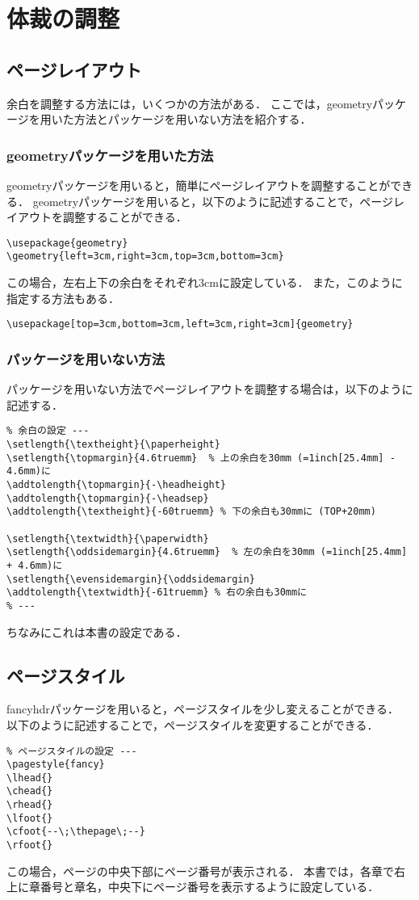 \section{体裁の調整}
\subsection{ページレイアウト}
余白を調整する方法には，いくつかの方法がある．
ここでは，geometryパッケージを用いた方法とパッケージを用いない方法を紹介する．
\subsubsection{geometryパッケージを用いた方法}
geometryパッケージを用いると，簡単にページレイアウトを調整することができる．
geometryパッケージを用いると，以下のように記述することで，ページレイアウトを調整することができる．
\begin{lstlisting}
\usepackage{geometry}
\geometry{left=3cm,right=3cm,top=3cm,bottom=3cm}
\end{lstlisting}
この場合，左右上下の余白をそれぞれ3cmに設定している．
また，このように指定する方法もある．
\begin{lstlisting}
\usepackage[top=3cm,bottom=3cm,left=3cm,right=3cm]{geometry}
\end{lstlisting}
\subsubsection{パッケージを用いない方法}
パッケージを用いない方法でページレイアウトを調整する場合は，以下のように記述する．
\begin{lstlisting}
% 余白の設定 ---
\setlength{\textheight}{\paperheight}
\setlength{\topmargin}{4.6truemm}  % 上の余白を30mm (=1inch[25.4mm] - 4.6mm)に
\addtolength{\topmargin}{-\headheight}
\addtolength{\topmargin}{-\headsep}
\addtolength{\textheight}{-60truemm} % 下の余白も30mmに (TOP+20mm)

\setlength{\textwidth}{\paperwidth}
\setlength{\oddsidemargin}{4.6truemm}  % 左の余白を30mm (=1inch[25.4mm] + 4.6mm)に
\setlength{\evensidemargin}{\oddsidemargin}
\addtolength{\textwidth}{-61truemm} % 右の余白も30mmに
% ---
\end{lstlisting}
ちなみにこれは本書の設定である．
\subsection{ページスタイル}
fancyhdrパッケージを用いると，ページスタイルを少し変えることができる．
以下のように記述することで，ページスタイルを変更することができる．
\begin{lstlisting}
% ページスタイルの設定 ---
\pagestyle{fancy}
\lhead{}
\chead{}
\rhead{}
\lfoot{}
\cfoot{--\;\thepage\;--}
\rfoot{}
\end{lstlisting}
この場合，ページの中央下部にページ番号が表示される．
本書では，各章で右上に章番号と章名，中央下にページ番号を表示するように設定している．
